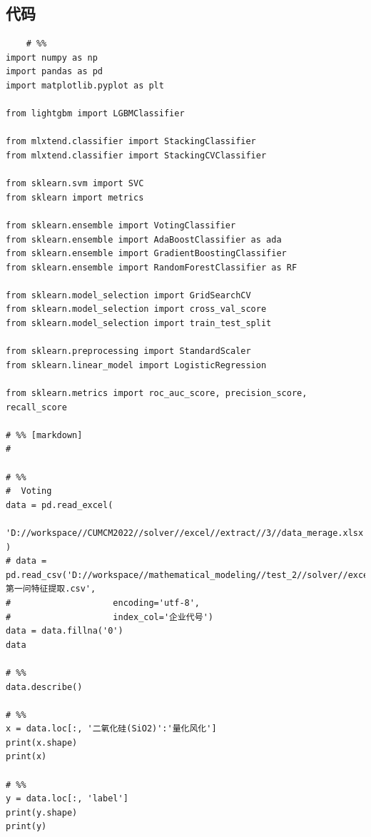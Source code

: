 \documentclass[UTF8]{ctexart}
\begin{document}
\clearpage





% 

\subsection*{代码}

\lstset{language=Python}
\begin{lstlisting}
	# %%
import numpy as np
import pandas as pd
import matplotlib.pyplot as plt

from lightgbm import LGBMClassifier

from mlxtend.classifier import StackingClassifier
from mlxtend.classifier import StackingCVClassifier

from sklearn.svm import SVC
from sklearn import metrics

from sklearn.ensemble import VotingClassifier
from sklearn.ensemble import AdaBoostClassifier as ada
from sklearn.ensemble import GradientBoostingClassifier
from sklearn.ensemble import RandomForestClassifier as RF

from sklearn.model_selection import GridSearchCV
from sklearn.model_selection import cross_val_score
from sklearn.model_selection import train_test_split

from sklearn.preprocessing import StandardScaler
from sklearn.linear_model import LogisticRegression

from sklearn.metrics import roc_auc_score, precision_score, recall_score

# %% [markdown]
#

# %%
#  Voting
data = pd.read_excel(
    'D://workspace//CUMCM2022//solver//excel//extract//3//data_merage.xlsx'
)
# data = pd.read_csv('D://workspace//mathematical_modeling//test_2//solver//excel//extract//1//第一问特征提取.csv',
#                    encoding='utf-8',
#                    index_col='企业代号')
data = data.fillna('0')
data

# %%
data.describe()

# %%
x = data.loc[:, '二氧化硅(SiO2)':'量化风化']
print(x.shape)
print(x)

# %%
y = data.loc[:, 'label']
print(y.shape)
print(y)


\end{lstlisting}
\end{document}
